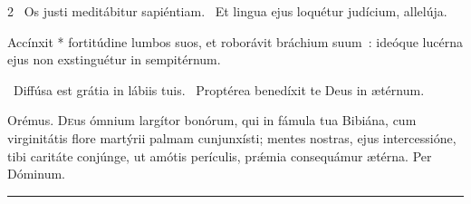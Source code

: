 \documentclass[9pt,twoside]{extarticle}
\begin{document}
\begin{multicols}{2}
~Os justi meditábitur sapiéntiam. ~Et lingua ejus loquétur judícium, allelúja.

\smallskip
{\small {}}

 Accínxit * fortitúdine lumbos suos, et roborávit bráchium suum~: ideóque lucérna ejus non exstinguétur in sempitérnum.

~Diffúsa est grátia in lábiis tuis. ~Proptérea benedíxit te Deus in ætérnum.

\smallskip
Orémus. \hfill {}
\lettrine{D}eus ómnium largítor bonórum, qui in fámula tua Bibiána, cum virginitátis flore martýrii palmam cunjunxísti; mentes nostras, ejus intercessióne, tibi caritáte conjúnge, ut amótis perículis, prǽmia consequámur ætérna. Per Dóminum.

\begin{center}\textcolor{red}{\rule{\linewidth}{0.5pt}} \end{center}

\end{multicols}
\end{document}
